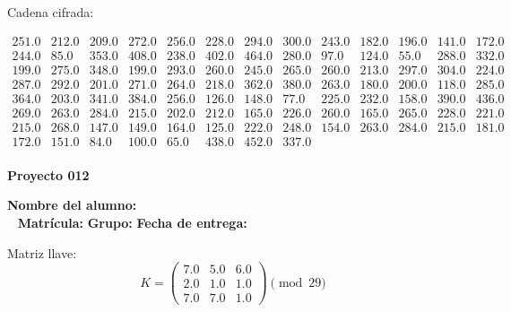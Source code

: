 \documentclass[12pt]{article}
\begin{document}
Cadena cifrada:
\begin{center}
$\begin{array}{lllllllllllll}
251.0 & 212.0 & 209.0 & 272.0 & 256.0 & 228.0 & 294.0 & 300.0 & 243.0 & 182.0 & 196.0 & 141.0 & 172.0\\
244.0 & 85.0 & 353.0 & 408.0 & 238.0 & 402.0 & 464.0 & 280.0 & 97.0 & 124.0 & 55.0 & 288.0 & 332.0\\
199.0 & 275.0 & 348.0 & 199.0 & 293.0 & 260.0 & 245.0 & 265.0 & 260.0 & 213.0 & 297.0 & 304.0 & 224.0\\
287.0 & 292.0 & 201.0 & 271.0 & 264.0 & 218.0 & 362.0 & 380.0 & 263.0 & 180.0 & 200.0 & 118.0 & 285.0\\
364.0 & 203.0 & 341.0 & 384.0 & 256.0 & 126.0 & 148.0 & 77.0 & 225.0 & 232.0 & 158.0 & 390.0 & 436.0\\
269.0 & 263.0 & 284.0 & 215.0 & 202.0 & 212.0 & 165.0 & 226.0 & 260.0 & 165.0 & 265.0 & 228.0 & 221.0\\
215.0 & 268.0 & 147.0 & 149.0 & 164.0 & 125.0 & 222.0 & 248.0 & 154.0 & 263.0 & 284.0 & 215.0 & 181.0\\
172.0 & 151.0 & 84.0 & 100.0 & 65.0 & 438.0 & 452.0 & 337.0\\
\end{array}$
\end{center}

\newpage


\textbf{Proyecto 012}

\textbf{Nombre del alumno:} \underline{\hspace{13cm}}\\\
\vspace{1cm}
\textbf{Matrícula:} \underline{\hspace{4cm}} \hspace{1cm}
\textbf{Grupo:} \underline{\hspace{2cm}}
\textbf{Fecha de entrega:} \underline{\hspace{2cm}}

\medskip

Matriz llave:
\[
K = \begin{pmatrix}
7.0 & 5.0 & 6.0\\
2.0 & 1.0 & 1.0\\
7.0 & 7.0 & 1.0
\end{pmatrix} \pmod{29}
\]
\end{document}
